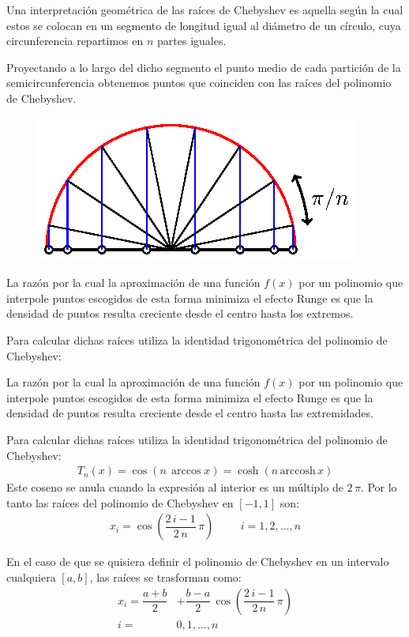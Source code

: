 Una interpretación geométrica de las raíces de Chebyshev es aquella según la cual estos se colocan en un segmento de longitud igual al diámetro de un círculo, cuya circunferencia repartimos en $n$ partes iguales.
\par
Proyectando a lo largo del dicho segmento el punto medio de cada partición de la semicircunferencia obtenemos puntos que coinciden con las raíces del polinomio de Chebyshev.
\begin{figure}[H]
    \centering
    \includegraphics[scale=1]{Imagenes/Nodos_Chebychev_01.eps}
\end{figure}

La razón por la cual la aproximación de una función $f(x)$ por un polinomio que interpole puntos escogidos de esta forma minimiza el efecto Runge es que la densidad de puntos resulta creciente desde el centro hasta los extremos.
\par
Para calcular dichas raíces utiliza la identidad trigonométrica del polinomio de Chebyshev:

La razón por la cual la aproximación de una función $f(x)$ por un polinomio que interpole puntos escogidos de esta forma minimiza el efecto Runge es que la densidad de puntos resulta creciente desde el centro hasta las extremidades.
\par
Para calcular dichas raíces utiliza la identidad trigonométrica del polinomio de Chebyshev:
\begin{align*}
T_{n}(x) = \cos (n \, \arccos x) = \cosh (n \, \mbox{arccosh} \, x)
\end{align*}
Este coseno se anula cuando la expresión al interior es un múltiplo de $2 \, \pi$.  Por lo tanto las raíces del polinomio de Chebyshev en $[-1,1]$ son:
\begin{align*}
x_{i} = \cos \left( \dfrac{2 \, i - 1}{2 \, n} \, \pi \right) \hspace{1cm} i = 1, 2, \ldots, n
\end{align*}

En el caso de que se quisiera definir el polinomio de Chebyshev en un intervalo cualquiera $[a, b]$, las raíces se trasforman como:
\begin{align*}
x_{i} = \dfrac{a + b}{2} &+ \dfrac{b - a}{2} \, \cos \left( \dfrac{2 \, i - 1}{2 \, n} \, \pi \right) \\[0.5em] 
i =& 0, 1, \ldots, n
\end{align*}

